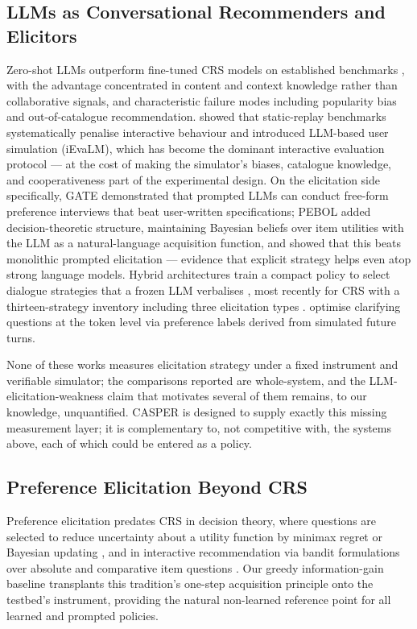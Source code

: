 \documentclass[11pt]{article}
\begin{document}
\subsection{LLMs as Conversational Recommenders and Elicitors}

Zero-shot LLMs outperform fine-tuned CRS models on established benchmarks
\citep{he2023large}, with the advantage concentrated in content and context
knowledge rather than collaborative signals, and characteristic failure
modes including popularity bias and out-of-catalogue recommendation.
\citet{wang2023rethinking} showed that static-replay benchmarks
systematically penalise interactive behaviour and introduced LLM-based user
simulation (iEvaLM), which has become the dominant interactive evaluation
protocol --- at the cost of making the simulator's biases, catalogue
knowledge, and cooperativeness part of the experimental design. On the
elicitation side specifically, GATE \citep{li2023eliciting} demonstrated
that prompted LLMs can conduct free-form preference interviews that beat
user-written specifications; PEBOL \citep{austin2024bayesian} added
decision-theoretic structure, maintaining Bayesian beliefs over item
utilities with the LLM as a natural-language acquisition function, and
showed that this beats monolithic prompted elicitation --- evidence that
explicit strategy helps even atop strong language models. Hybrid
architectures train a compact policy to select dialogue strategies that a
frozen LLM verbalises \citep{deng2023plug}, most recently for CRS with a
thirteen-strategy inventory including three elicitation types
\citep{zhao2025reinforced}. \citet{zhang2025modeling} optimise clarifying
questions at the token level via preference labels derived from simulated
future turns.

None of these works measures elicitation strategy under a fixed instrument
and verifiable simulator; the comparisons reported are whole-system, and
the LLM-elicitation-weakness claim that motivates several of them remains,
to our knowledge, unquantified. CASPER is designed to supply exactly this
missing measurement layer; it is complementary to, not competitive with,
the systems above, each of which could be entered as a policy.

\subsection{Preference Elicitation Beyond CRS}

Preference elicitation predates CRS in decision theory, where questions are
selected to reduce uncertainty about a utility function by minimax regret
\citep{viappiani2009regret} or Bayesian updating \citep{mangili2020bayesian},
and in interactive recommendation via bandit formulations over absolute and
comparative item questions \citep{christakopoulou2016towards}. Our greedy
information-gain baseline transplants this tradition's one-step acquisition
principle onto the testbed's instrument, providing the natural
non-learned reference point for all learned and prompted policies.
\end{document}
